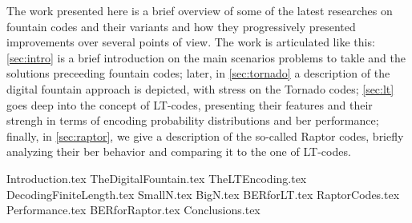\documentclass[12pt,a4paper,titlepage]{article}
\begin{document}
The work presented here is a brief overview of some of the latest researches on fountain codes and their variants and how they progressively presented improvements over several points of view. The work is articulated like this: \autoref{sec:intro} is a brief introduction on the main scenarios problems to takle and the solutions preceeding fountain codes; later, in \autoref{sec:tornado} a description of the digital fountain approach is depicted, with stress on the Tornado codes; \autoref{sec:lt} goes deep into the concept of LT-codes, presenting their features and their strengh in terms of encoding probability distributions and \gls{ber} performance; finally, in \autoref{sec:raptor}, we give a description of the so-called Raptor codes, briefly analyzing their \gls{ber} behavior and comparing it to the one of LT-codes.

{Introduction.tex}
{TheDigitalFountain.tex}
{TheLTEncoding.tex}
{DecodingFiniteLength.tex}
{SmallN.tex}
{BigN.tex}
{BERforLT.tex}
{RaptorCodes.tex}
{Performance.tex}
{BERforRaptor.tex}
{Conclusions.tex}



\end{document}
